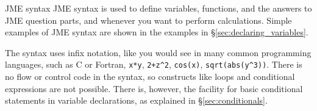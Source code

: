%
%
%

\begin{chapter}{\label{cha:jme_syntax}JME syntax}
  JME syntax is used to define variables, functions, and the answers to JME
  question parts, and whenever you want to perform calculations.  Simple
  examples of JME syntax are shown in the examples in
  \S\ref{sec:declaring_variables}.

  The syntax uses infix notation, like you would see in many common programming
  languages, such as C or Fortran, \eg \verb"x*y", \verb"2+z^2", \verb"cos(x)",
  \verb"sqrt(abs(y^3))".  There is no flow or control code in the syntax, so
  constructs like loops and conditional expressions are not possible.  There
  is, however, the facility for basic conditional statements in variable
  declarations, as explained in \S\ref{sec:conditionals}.


\end{chapter}
